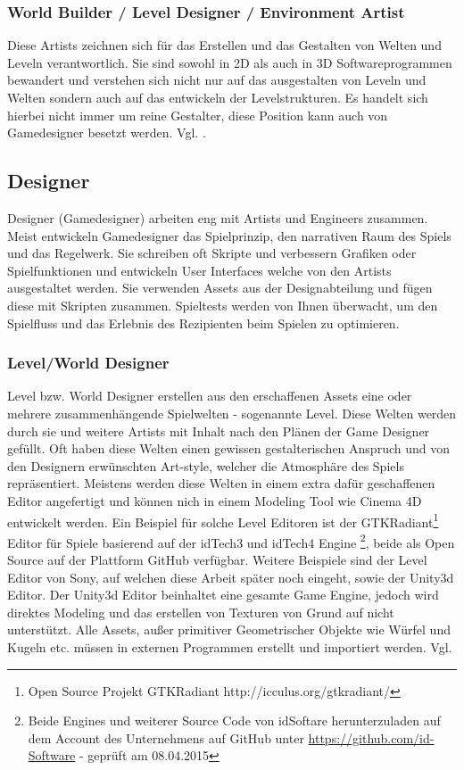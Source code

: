 \documentclass[pagesize, paper=a4, fontsize=12pt, titlepage=true, headings=small, headnosepline, abstractoff, liststotoc, nochapterprefix, plainheadsepline, twoside]{scrreprt}
\begin{document}
\subsubsection{World Builder / Level Designer / Environment Artist}
Diese Artists zeichnen sich für das Erstellen und das Gestalten von Welten und Leveln verantwortlich. Sie sind sowohl in 2D als auch in 3D Softwareprogrammen bewandert und verstehen sich nicht nur auf das ausgestalten von Leveln und Welten sondern auch auf das entwickeln der Levelstrukturen. Es handelt sich hierbei nicht immer um reine Gestalter, diese Position kann auch von Gamedesigner besetzt werden. Vgl. \parencite[S. 24]{Chandler2006}.

\subsection{Designer}
Designer (Gamedesigner) arbeiten eng mit Artists und Engineers zusammen. Meist entwickeln Gamedesigner das Spielprinzip, den narrativen Raum des Spiels und das Regelwerk. Sie schreiben oft Skripte und verbessern Grafiken oder Spielfunktionen und entwickeln User Interfaces welche von den Artists ausgestaltet werden. Sie verwenden Assets aus der Designabteilung und fügen diese mit Skripten zusammen. Spieltests werden von Ihnen überwacht, um den Spielfluss und das Erlebnis des Rezipienten beim Spielen zu optimieren.
\subsubsection{Level/World Designer}
Level bzw. World Designer erstellen aus den erschaffenen Assets eine oder mehrere zusammenhängende Spielwelten - sogenannte Level. Diese Welten werden durch sie und weitere Artists mit Inhalt nach den Plänen der Game Designer gefüllt. Oft haben diese Welten einen gewissen gestalterischen Anspruch und von den Designern erwünschten Art-style, welcher die Atmosphäre des Spiels repräsentiert. Meistens werden diese Welten in einem extra dafür geschaffenen Editor angefertigt und können nich in einem Modeling Tool wie Cinema 4D entwickelt werden. Ein Beispiel für solche Level Editoren ist der GTKRadiant\footnote{Open Source Projekt GTKRadiant http://icculus.org/gtkradiant/} Editor für Spiele basierend auf der idTech3 und idTech4  Engine \footnote{Beide Engines und weiterer Source Code von idSoftare herunterzuladen auf dem Account des Unternehmens auf GitHub unter \url{https://github.com/id-Software} - geprüft am 08.04.2015}, beide als Open Source auf der Plattform GitHub verfügbar. Weitere Beispiele sind der Level Editor von Sony, auf welchen diese Arbeit später noch eingeht, sowie der Unity3d Editor. Der Unity3d Editor beinhaltet eine gesamte Game Engine, jedoch wird direktes Modeling und das erstellen von Texturen von Grund auf nicht unterstützt. Alle Assets, außer primitiver Geometrischer Objekte wie Würfel und Kugeln etc. müssen in externen Programmen erstellt und importiert werden. Vgl. \parencite[S. 31 ]{Chandler2006}
\end{document}
